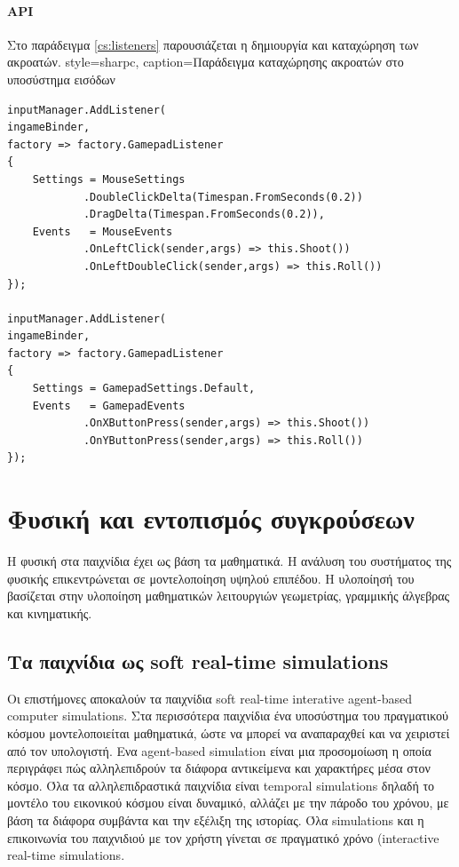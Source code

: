 	\newpage
	\paragraph{API}
	Στο παράδειγμα \ref{cs:listeners} παρουσιάζεται η δημιουργία και καταχώρηση των ακροατών. 
	\lstset
	{		
		style=sharpc, 
		caption={Παράδειγμα καταχώρησης ακροατών στο υποσύστημα εισόδων}
	}
	\label{cs:listeners}
	\begin{lstlisting}
inputManager.AddListener(
ingameBinder,
factory => factory.GamepadListener
{
	Settings = MouseSettings
		    .DoubleClickDelta(Timespan.FromSeconds(0.2))
			.DragDelta(Timespan.FromSeconds(0.2)),
	Events   = MouseEvents
	        .OnLeftClick(sender,args) => this.Shoot())
	        .OnLeftDoubleClick(sender,args) => this.Roll())      	
});

inputManager.AddListener(
ingameBinder,
factory => factory.GamepadListener
{
	Settings = GamepadSettings.Default,
	Events   = GamepadEvents
			.OnXButtonPress(sender,args) => this.Shoot())
			.OnYButtonPress(sender,args) => this.Roll())      	
});
\end{lstlisting}

\section{Φυσική και εντοπισμός συγκρούσεων}
Η φυσική στα παιχνίδια έχει ως βάση τα μαθηματικά. Η ανάλυση του συστήματος της φυσικής επικεντρώνεται σε μοντελοποίηση υψηλού επιπέδου. Η υλοποίησή του βασίζεται στην υλοποίηση μαθηματικών λειτουργιών γεωμετρίας, γραμμικής άλγεβρας και κινηματικής.

\subsection{Τα παιχνίδια ως soft real-time simulations}
Οι επιστήμονες αποκαλούν τα παιχνίδια soft real-time interative agent-based computer simulations.
Στα περισσότερα παιχνίδια ένα υποσύστημα του πραγματικού κόσμου μοντελοποιείται μαθηματικά, ώστε να μπορεί να αναπαραχθεί και να χειριστεί από τον υπολογιστή. 
Ενα agent-based simulation είναι μια προσομοίωση η οποία περιγράφει πώς αλληλεπιδρούν τα διάφορα αντικείμενα και χαρακτήρες μέσα στον κόσμο.
Όλα τα αλληλεπιδραστικά παιχνίδια είναι temporal simulations δηλαδή το μοντέλο του εικονικού κόσμου είναι δυναμικό, αλλάζει με την πάροδο του χρόνου, με βάση τα διάφορα συμβάντα και την εξέλιξη της ιστορίας.
Όλα simulations και η επικοινωνία του παιχνιδιού με τον χρήστη γίνεται σε πραγματικό χρόνο (interactive real-time simulations. 

